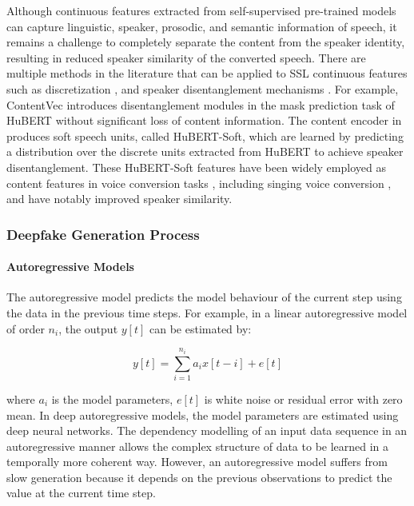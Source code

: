 Although continuous features extracted from self-supervised pre-trained models can capture linguistic, speaker, prosodic, and semantic information of speech, it remains a challenge to completely separate the content from the speaker identity, resulting in reduced speaker similarity of the converted speech. There are multiple methods in the literature that can be applied to SSL continuous features such as discretization \cite{polyak2021, softvc}, and speaker disentanglement mechanisms \cite{contentvec}. For example, ContentVec \cite{contentvec} introduces disentanglement modules in the mask prediction task of HuBERT without significant loss of content information. The content encoder in \cite{softvc} produces soft speech units, called HuBERT-Soft, which are learned by predicting a distribution over the discrete units extracted from HuBERT to achieve speaker disentanglement. These HuBERT-Soft features have been widely employed as content features in voice conversion tasks \cite{quickvc, rythmvc, streamvc}, including singing voice conversion \cite{singingvc, diffsvc}, and have notably improved speaker similarity.


\subsubsection{Deepfake Generation Process} 

\paragraph{Autoregressive Models}

The autoregressive model predicts the model behaviour of the current step using the data in the previous time steps. For example, in a linear autoregressive model of order $n_i$, the output $y[t]$ can be estimated by:

\begin{equation}
y[t] = \sum^{n_i}_{i=1} a_{i}x[t-i] + e[t]
\end{equation}

where $a_{i}$ is the model parameters, $e[t]$ is white noise or residual error with zero mean. In deep autoregressive models, the model parameters are estimated using deep neural networks. The dependency modelling of an input data sequence in an autoregressive manner allows the complex structure of data to be learned in a temporally more coherent way. However, an autoregressive model suffers from slow generation because it depends on the previous observations to predict the value at the current time step. 

